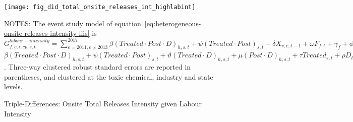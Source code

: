 \begin{figure}[H]
    \centering
    \texttt{[image: fig\_did\_total\_onsite\_releases\_int\_highlabint]}
    \caption{Triple-Differences: Onsite Total Releases Intensity given Labour Intensity}
    \label{fig:heterogeneous-onsite-releases-intensity-liis}
    \begin{minipage}{12cm}
        \vspace{0.05in}
        NOTES: The event study model of equation~\ref{eq:heterogeneous-onsite-releases-intensity-liis} is $G_{f,c,i,cp,s,t}^{labour-intensity} = \sum_{{e = 2011},{e \neq 2013}}^{2017} \beta (Treated \cdot Post \cdot D)_{h,s,t} + \psi (Treated \cdot Post)_{s,t} + \delta X_{v,c,t-1} + \omega F_{f,t} + \gamma_{f} + \phi_{cp} + \eta_{c,t} + \left[\lambda_{t} + \theta_{f,h} + \sigma_{s} + \zeta_{c} \right] + \varepsilon_{f,c,i,cp,s,t}$$\beta (Treated \cdot Post \cdot D)_{h,s,t} + \psi (Treated \cdot Post)_{s,t} + \vartheta (Treated \cdot D)_{h,s,t} + \mu (Post \cdot D)_{h,s,t} + \tau Treated_{s,t} + \rho D_{h,s,t} + \alpha Post_{t} + \delta X_{v,c,t-1} + \omega F_{f,t} + \gamma_{f} + \phi_{cp} + \eta_{c,t} + \left[\lambda_{t} + \theta_{h} + \sigma_{s} + \zeta_{c} \right] + \varepsilon_{f,c,i,cp,s,t}$. Three-way clustered robust standard errors are reported in parentheses, and clustered at the toxic chemical, industry and state levels.
    \end{minipage}
\end{figure}